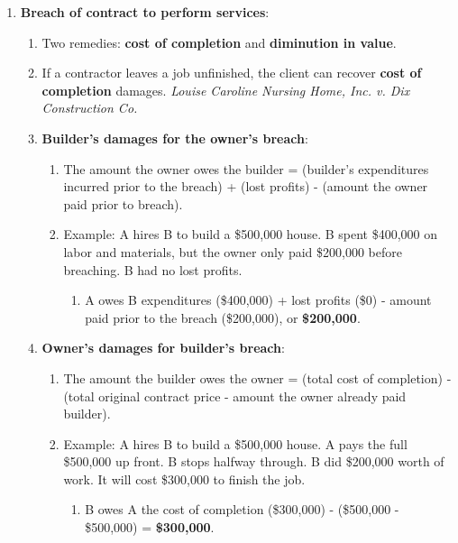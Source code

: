 \begin{enumerate}
    \item \textbf{Breach of contract to perform services}:
    \begin{enumerate}
        \item Two remedies: \textbf{cost of completion} and \textbf{diminution 
        in value}.
        \item If a contractor leaves a job unfinished, the client can recover 
        \textbf{cost of completion} damages. \emph{Louise Caroline Nursing 
        Home, Inc. v. Dix Construction Co.}
        \item \textbf{Builder's damages for the owner's breach}:
        \begin{enumerate}
            \item The amount the owner owes the builder = (builder's 
            expenditures incurred prior to the breach) + (lost profits) - 
            (amount the owner paid prior to breach).
            \item Example: A hires B to build a \$500,000 house. B spent 
            \$400,000 on labor and materials, but the owner only paid 
            \$200,000 before breaching. B had no lost profits.
            \begin{enumerate}
                \item A owes B expenditures (\$400,000) + lost profits 
                (\$0) - amount paid prior to the breach (\$200,000), or 
                \textbf{\$200,000}.
            \end{enumerate}
        \end{enumerate}
        \item \textbf{Owner's damages for builder's breach}:
        \begin{enumerate}
            \item The amount the builder owes the owner = (total cost of 
            completion) - (total original contract price - amount the owner 
            already paid builder).
            \item Example: A hires B to build a \$500,000 house. A pays the 
            full \$500,000 up front. B stops halfway through. B did \$200,000 
            worth of work. It will cost \$300,000 to finish the job.
            \begin{enumerate}
                \item B owes A the cost of completion (\$300,000) - (\$500,000 
                - \$500,000) = \textbf{\$300,000}.
            \end{enumerate}

\end{enumerate}
\end{enumerate}
\end{enumerate}
